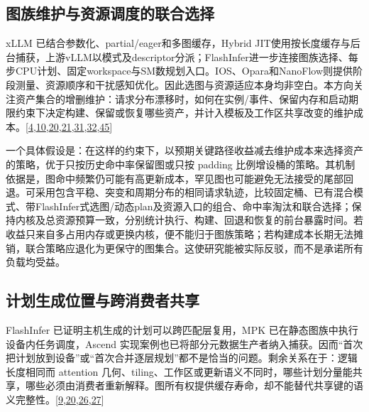 \documentclass[
  UTF8,
  zihao=5]{ctexart}
\begin{document}
\hypertarget{ux56feux65cfux7ef4ux62a4ux4e0eux8d44ux6e90ux8c03ux5ea6ux7684ux8054ux5408ux9009ux62e9}{%
\subsection*{图族维护与资源调度的联合选择}\label{ux56feux65cfux7ef4ux62a4ux4e0eux8d44ux6e90ux8c03ux5ea6ux7684ux8054ux5408ux9009ux62e9}}

xLLM 已结合参数化、partial/eager和多图缓存，Hybrid
JIT使用按长度缓存与后台捕获，上游vLLM以模式及descriptor分派；FlashInfer进一步连接图族选择、每步CPU计划、固定workspace与SM数规划入口。IOS、Opara和NanoFlow则提供阶段测量、资源顺序和干扰感知优化。因此选图与资源适应本身均非空白。本方向关注资产集合的增删维护：请求分布漂移时，如何在实例/事件、保留内存和启动期限约束下决定构建、保留或恢复哪些资产，并计入模板及工作区共享改变的维护成本。{[}\protect\hyperlink{ref-liu2025xllm}{4},\protect\hyperlink{ref-ding2021ios}{10},\protect\hyperlink{ref-ye2025flashinfer}{20},\protect\hyperlink{ref-yadav2026hybridpreprint}{21},\protect\hyperlink{ref-chen2025opara}{31},\protect\hyperlink{ref-zhu2025nanoflow}{32},\protect\hyperlink{ref-vllmcudagraphdesign}{45}{]}

一个具体假设是：在这样的约束下，以预期关键路径收益减去维护成本来选择资产的策略，优于只按历史命中率保留图或只按
padding
比例增设桶的策略。其机制依据是，图命中频繁仍可能有高更新成本，罕见图也可能避免无法接受的尾部回退。可采用包含平稳、突变和周期分布的相同请求轨迹，比较固定桶、已有混合模式、带FlashInfer式选图/动态plan及资源入口的组合、命中率淘汰和联合选择；保持内核及总资源预算一致，分别统计执行、构建、回退和恢复的前台暴露时间。若收益只来自多占用内存或更换内核，便不能归于图族策略；若构建成本长期无法摊销，联合策略应退化为更保守的图集合。这使研究能被实际反驳，而不是承诺所有负载均受益。

\hypertarget{ux8ba1ux5212ux751fux6210ux4f4dux7f6eux4e0eux8de8ux6d88ux8d39ux8005ux5171ux4eab}{%
\subsection*{计划生成位置与跨消费者共享}\label{ux8ba1ux5212ux751fux6210ux4f4dux7f6eux4e0eux8de8ux6d88ux8d39ux8005ux5171ux4eab}}

FlashInfer 已证明主机生成的计划可以跨匹配层复用，MPK
已在静态图族中执行设备内任务调度，Ascend
实现案例也已将部分元数据生产者纳入捕获。因而``首次把计划放到设备''或``首次合并逐层规划''都不是恰当的问题。剩余关系在于：逻辑长度相同而
attention
几何、tiling、工作区或更新语义不同时，哪些计划分量能共享，哪些必须由消费者重新解释。图所有权提供缓存寿命，却不能替代共享键的语义完整性。{[}\protect\hyperlink{ref-vllmascendpr21259}{9},\protect\hyperlink{ref-ye2025flashinfer}{20},\protect\hyperlink{ref-vllmascendpr21281}{26},\protect\hyperlink{ref-cheng2026mpk}{27}{]}
\end{document}
